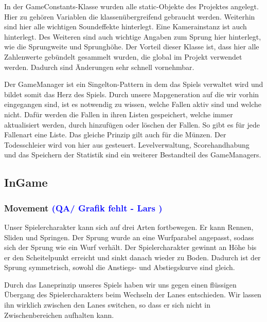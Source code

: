 \documentclass{article}
\begin{document}
In der GameConstants-Klasse wurden alle static-Objekte des Projektes angelegt. Hier zu gehören Variablen die klassenübergreifend gebraucht werden.
Weiterhin sind hier alle wichtigen Soundeffekte hinterlegt. Eine Kamerainstanz ist auch hinterlegt. Des Weiteren sind auch wichtige Angaben zum Sprung
hier hinterlegt, wie die Sprungweite und Sprunghöhe. Der Vorteil dieser Klasse ist, dass hier alle Zahlenwerte gebündelt gesammelt wurden, die global im
Projekt verwendet werden. Dadurch sind Änderungen sehr schnell vornehmbar.

Der GameManager ist ein Singelton-Pattern in dem das Spiels verwaltet wird und bildet somit das Herz des Spiels. Durch unsere Mapgeneration auf die wir
vorhin eingegangen sind, ist es notwendig zu wissen, welche Fallen aktiv sind und welche nicht. Dafür werden die Fallen in ihren Listen gespeichert, welche
immer aktualisiert werden, durch hinzufügen oder löschen der Fallen. So gibt es für jede Fallenart eine Liste. Das gleiche Prinzip gilt auch für die Münzen.
Der Todesschleier wird von hier aus gesteuert. Levelverwaltung, Scorehandhabung und das Speichern der Statistik sind ein weiterer Bestandteil des GameManagers.

\vspace{2cm}
\subsection{InGame}

\vspace{1cm}
\subsubsection{Movement \textcolor{blue}{(QA/ Grafik fehlt - Lars )}}

Unser Spielercharakter kann sich auf drei Arten fortbewegen. Er kann Rennen, Sliden und Springen. Der Sprung wurde an eine
Wurfparabel angepasst, sodass sich der Sprung wie ein Wurf verhält. Der Spielercharakter gewinnt an Höhe bis er den Scheitelpunkt
erreicht und sinkt danach wieder zu Boden. Dadurch ist der Sprung symmetrisch, sowohl die Anstiegs- und Abstiegskurve sind gleich.


Durch das Laneprinzip unseres Spiels haben wir uns gegen einen flüssigen Übergang des Spielercharakters beim Wechseln der Lanes
entschieden. Wir lassen ihn wirklich zwischen den Lanes switchen, so dass er sich nicht in Zwischenbereichen aufhalten kann.
\end{document}
